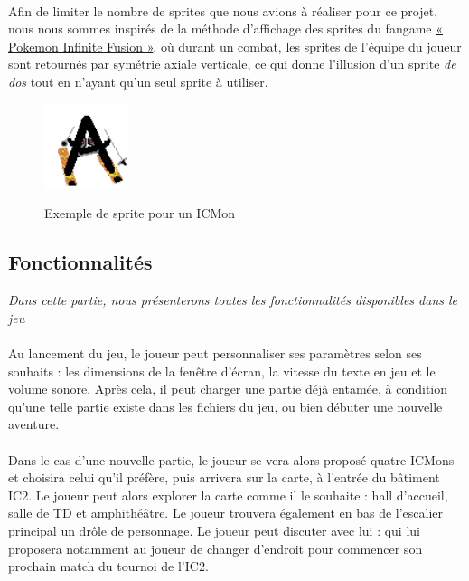\documentclass[12pt,a4paper, twoside]{article}
\begin{document}
        \paragraph{} Afin de limiter le nombre de sprites que nous avions à réaliser pour ce projet, nous nous sommes inspirés de la méthode d'affichage des sprites du fangame \href{https://infinitefusion.fandom.com/wiki/Pok%C3%A9mon_Infinite_Fusion_Wiki}{« Pokemon Infinite Fusion »}, où durant un combat, les sprites de l'équipe du joueur sont retournés par symétrie axiale verticale, ce qui donne l'illusion d'un sprite \emph{de dos} tout en n'ayant qu'un seul sprite à utiliser.
        \begin{figure}[h!]
            \centering
            \includegraphics[width=0.22\textwidth]{../assets/Monsters/New Versions/A-ski.png}
            \label{fig:ICMon}
            \caption{Exemple de sprite pour un ICMon}
        \end{figure} 

    \subsection{Fonctionnalités}
        \emph{Dans cette partie, nous présenterons toutes les fonctionnalités disponibles dans le jeu} \\
        \paragraph{} Au lancement du jeu, le joueur peut personnaliser ses paramètres selon ses souhaits : les dimensions de la fenêtre d'écran, la vitesse du texte en jeu et le volume sonore. Après cela, il peut charger une partie déjà entamée, à condition qu'une telle partie existe dans les fichiers du jeu, ou bien débuter une nouvelle aventure. \paragraph{}
        Dans le cas d'une nouvelle partie, le joueur se vera alors proposé quatre ICMons et choisira celui qu'il préfère, puis arrivera sur la carte, à l'entrée du bâtiment IC2. Le joueur peut alors explorer la carte comme il le souhaite : hall d'accueil, salle de TD et amphithéâtre. Le joueur trouvera également en bas de l'escalier principal un drôle de personnage.
        Le joueur peut discuter avec lui : qui lui proposera notamment au joueur de changer d'endroit pour commencer son prochain match du tournoi de l'IC2.
\end{document}
